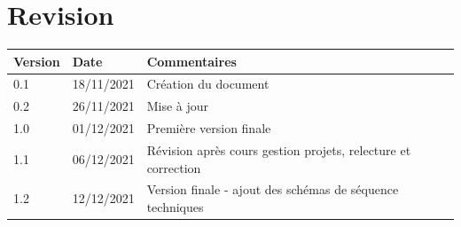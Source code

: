 \documentclass[a4paper, twoside, 12pt]{report}
\title{\titleOfDoc}
\author{\authors}
\begin{document}


\chapter*{Revision}
\begin{table}[!ht] %
	\begin{tabular}{ | m{3cm} | m{3cm}| m{8cm} | } 
		\hline
		\textbf{Version} & \textbf{Date} & \textbf{Commentaires} \\
		\hline
			0.1 & 18/11/2021 & Création du document\\
		\hline
			0.2 & 26/11/2021 & Mise à jour\\
		\hline
			1.0 & 01/12/2021  & Première version finale \\
		\hline
            1.1 & 06/12/2021 & Révision après cours gestion projets, relecture et correction \\
        \hline
            1.2 & 12/12/2021 & Version finale - ajout des schémas de séquence techniques \\
        \hline
	\end{tabular}
\end{table}

\renewcommand{\baselinestretch}{0.95}\normalsize
\tableofcontents
\renewcommand{\baselinestretch}{1.0}\normalsize
\newpage



%
%
\printbibliography[title=Réferences externes]
\end{document}
